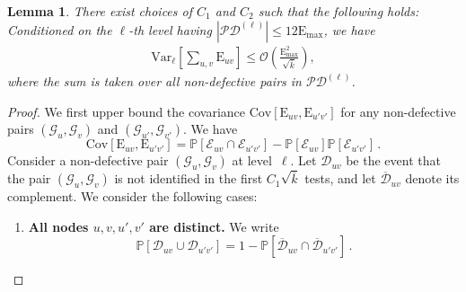 \documentclass[journal]{IEEEtran}
\newcommand{\rEm}{\mathrm{E}_{\max}}
\newcommand{\Var}{\mathrm{Var}}
\newcommand{\Cov}{\mathrm{Cov}}
\newtheorem{lemma}{Lemma}
\theoremstyle{definition}
\theoremstyle{definition}
\newcommand{\Dc}{\mathcal{D}}
\newcommand{\Ec}{\mathcal{E}}
\newcommand{\Gc}{\mathcal{G}}
\newcommand{\PP}{\mathbb{P}}
\newcommand{\rE}{\mathrm{E}}
\newcommand{\kb}{\overline{k}}
\newcommand{\bigO}{\mathcal{O}}
\newcommand{\barD}{\overline{\mathcal{D}}}
\begin{document}
%
%
\begin{lemma}
\label{lem:variance}
There exist choices of $C_1$ and $C_2$ such that the following holds: Conditioned on the $\ell$-th level having $|\mathcal{PD}^{(\ell)}| \leq 12 \rEm$, we have 
\begin{align*}
   \Var_{\ell} \left[\sum_{u,v} \rE_{uv} \right] \leq \bigO \left( \frac{\rEm^2}{\sqrt{\kb}} \right),
\end{align*} 
where the sum is taken over all non-defective pairs in $\mathcal{PD}^{(\ell)}$.
\end{lemma}

\begin{proof}
	We first upper bound the covariance $\Cov[\rE_{uv}, \rE_{u'v'}]$ for any non-defective pairs $(\Gc_u, \Gc_v)$ and $(\Gc_{u'}, \Gc_{v'})$. We have
	\begin{equation}
            \label{eq:cova_formula}
	    \Cov[\rE_{uv}, \rE_{u'v'}] = \PP[\Ec_{uv} \cap \Ec_{u'v'}] - \PP[\Ec_{uv}] \PP[\Ec_{u'v'}] \,.
	\end{equation}
Consider a non-defective pair $(\Gc_u, \Gc_v)$ at level~$\ell$. Let $\Dc_{uv}$ be the event that the pair $(\Gc_u, \Gc_v)$ is not identified in the first $C_1 \sqrt{\kb}$ tests, and let $\barD_{uv}$ denote its complement. We consider the following cases:
	
	\begin{enumerate}
		\item \textbf{All nodes $u, v, u', v'$ are distinct.} We write
             \begin{equation}\label{eq:lem_cova_prob_Duv_cap}
               \PP[\Dc_{uv} \cup \Dc_{u'v'}] = 1 - \PP[\barD_{uv} \cap \barD_{u'v'}] \, .
             \end{equation}
  

\end{enumerate}
\end{proof}
\end{document}

